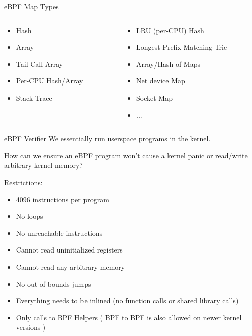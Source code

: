 \documentclass{beamer}
\begin{document}
\begin{frame}{eBPF Map Types}
  \begin{columns}
    \begin{column}{0.5\textwidth}
      \begin{itemize}
        \item Hash
        \item Array
        \item Tail Call Array
        \item Per-CPU Hash/Array
        \item Stack Trace
      \end{itemize}
    \end{column}
    \begin{column}{0.5\textwidth}
        \begin{center}
          \begin{itemize}
            \item LRU (per-CPU) Hash
            \item Longest-Prefix Matching Trie
            \item Array/Hash of Maps
            \item Net device Map
            \item Socket Map
            \item ...
          \end{itemize}
        \end{center}
    \end{column}
  \end{columns}
\end{frame}

\begin{frame}{eBPF Verifier}
  We essentially run userspace programs in the kernel. 
  \break

  How can we ensure an eBPF program won't cause a kernel panic or read/write arbitrary kernel memory?
  \break

  \pause

  Restrictions:

  \begin{itemize}
  \item 4096 instructions per program
  \item No loops
  \item No unreachable instructions
  \item Cannot read uninitialized registers
  \item Cannot read any arbitrary memory
  \item No out-of-bounds jumps
  \item Everything needs to be inlined (no function calls or shared library calls)
  \item Only calls to BPF Helpers ( BPF to BPF is also allowed on newer kernel versions )
  \end{itemize}
\end{frame}
\end{document}
